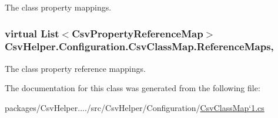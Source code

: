The class property mappings. 

\hypertarget{a00040_a6dfbf8f743b16d2ec83edef865ea2d9e}{
\subsubsection[{Reference\-Maps}]{\setlength{\rightskip}{0pt plus 5cm}virtual List$<${\bf Csv\-Property\-Reference\-Map}$>$ Csv\-Helper.\-Configuration.\-Csv\-Class\-Map.\-Reference\-Maps\hspace{0.3cm}{\ttfamily [get]}, {\ttfamily [inherited]}}}\label{a00040_a6dfbf8f743b16d2ec83edef865ea2d9e}


The class property reference mappings. 



The documentation for this class was generated from the following file\-:\begin{DoxyCompactItemize}
\item 
packages/\-Csv\-Helper..../src/\-Csv\-Helper/\-Configuration/\hyperlink{a00183}{Csv\-Class\-Map`1.\-cs}\end{DoxyCompactItemize}
